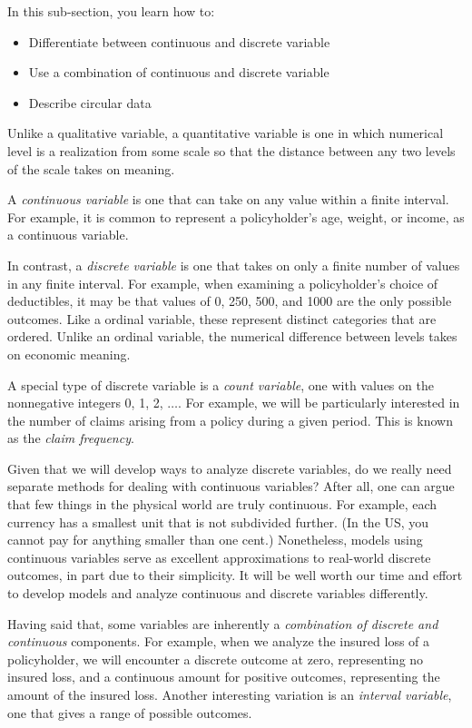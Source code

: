 \documentclass[]{book}
\providecommand{\tightlist}{%
  \setlength{\itemsep}{0pt}\setlength{\parskip}{0pt}}
\theoremstyle{definition}
\theoremstyle{definition}
\theoremstyle{definition}
\theoremstyle{remark}
\begin{document}
In this sub-section, you learn how to:

\begin{itemize}
\tightlist
\item
  Differentiate between continuous and discrete variable
\item
  Use a combination of continuous and discrete variable
\item
  Describe circular data
\end{itemize}

Unlike a qualitative variable, a quantitative variable is one in which
numerical level is a realization from some scale so that the distance
between any two levels of the scale takes on meaning.

A \emph{continuous variable} is one that can take on any value within a
finite interval. For example, it is common to represent a policyholder's
age, weight, or income, as a continuous variable.

In contrast, a \emph{discrete variable} is one that takes on only a
finite number of values in any finite interval. For example, when
examining a policyholder's choice of deductibles, it may be that values
of 0, 250, 500, and 1000 are the only possible outcomes. Like a ordinal
variable, these represent distinct categories that are ordered. Unlike
an ordinal variable, the numerical difference between levels takes on
economic meaning.

A special type of discrete variable is a \emph{count variable}, one with
values on the nonnegative integers 0, 1, 2, \(\ldots.\) For example, we
will be particularly interested in the number of claims arising from a
policy during a given period. This is known as the \emph{claim
frequency}.

Given that we will develop ways to analyze discrete variables, do we
really need separate methods for dealing with continuous variables?
After all, one can argue that few things in the physical world are truly
continuous. For example, each currency has a smallest unit that is not
subdivided further. (In the US, you cannot pay for anything smaller than
one cent.) Nonetheless, models using continuous variables serve as
excellent approximations to real-world discrete outcomes, in part due to
their simplicity. It will be well worth our time and effort to develop
models and analyze continuous and discrete variables differently.

Having said that, some variables are inherently a \emph{combination of
discrete and continuous} components. For example, when we analyze the
insured loss of a policyholder, we will encounter a discrete outcome at
zero, representing no insured loss, and a continuous amount for positive
outcomes, representing the amount of the insured loss. Another
interesting variation is an \emph{interval variable}, one that gives a
range of possible outcomes.
\end{document}
